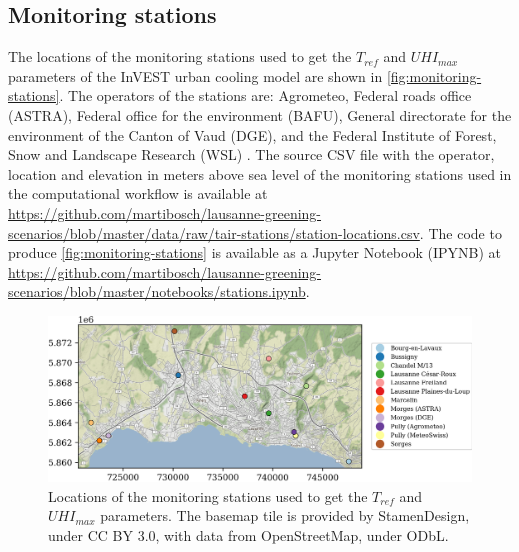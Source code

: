 \documentclass[10pt,letterpaper]{article}
\begin{document}


\subsection*{Monitoring stations}
\label{sec:monitoring-stations}

The locations of the monitoring stations used to get the $T_{ref}$ and $UHI_{max}$ parameters of the InVEST urban cooling model are shown in \autoref{fig:monitoring-stations}. The operators of the stations are: Agrometeo, Federal roads office (ASTRA), Federal office for the environment (BAFU), General directorate for the environment of the Canton of Vaud (DGE), and the Federal Institute of Forest, Snow and Landscape Research (WSL) \cite{rebetez2018meteorological}.
The source CSV file with the operator, location and elevation in meters above sea level of the monitoring stations used in the computational workflow is available at \url{https://github.com/martibosch/lausanne-greening-scenarios/blob/master/data/raw/tair-stations/station-locations.csv}.
The code to produce \autoref{fig:monitoring-stations} is available as a Jupyter Notebook (IPYNB) at \url{https://github.com/martibosch/lausanne-greening-scenarios/blob/master/notebooks/stations.ipynb}.

\begin{figure}[ht]
  \centering
  \includegraphics[width=.98\textwidth]{figures/monitoring-stations}
  \caption{\label{fig:monitoring-stations} Locations of the monitoring stations used to get the $T_{ref}$ and $UHI_{max}$ parameters. The basemap tile is provided by StamenDesign, under CC BY 3.0, with data from OpenStreetMap, under ODbL.}
\end{figure}
\end{document}
